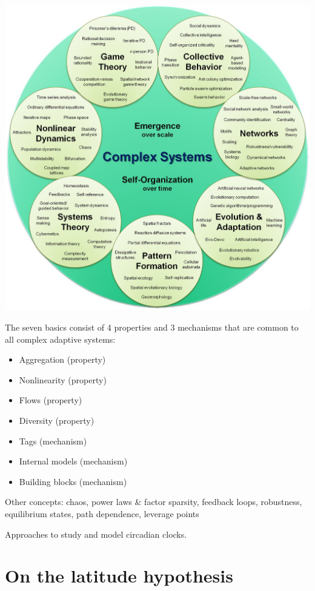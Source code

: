 \documentclass[
12pt,
openright,
oneside,
a4paper,
chapter=TITLE,
section=TITLE,
french,
spanish,
brazil,
english
]{abntex2}\usepackage{array}
\begin{document}
\includegraphics{qmd/images/sayama-2015-figure-1.png}

The seven basics consist of 4 properties and 3 mechanisms that are
common to all complex adaptive systems:

\begin{itemize}
\tightlist
\item
  Aggregation (property)
\item
  Nonlinearity (property)
\item
  Flows (property)
\item
  Diversity (property)
\item
  Tags (mechanism)
\item
  Internal models (mechanism)
\item
  Building blocks (mechanism)
\end{itemize}

\autocite{holland1996}

Other concepts: chaos, power laws \& factor sparsity, feedback loops,
robustness, equilibrium states, path dependence, leverage points

Approaches to study and model circadian clocks.


\chapter{On the latitude hypothesis}\label{on-the-latitude-hypothesis}
\end{document}
